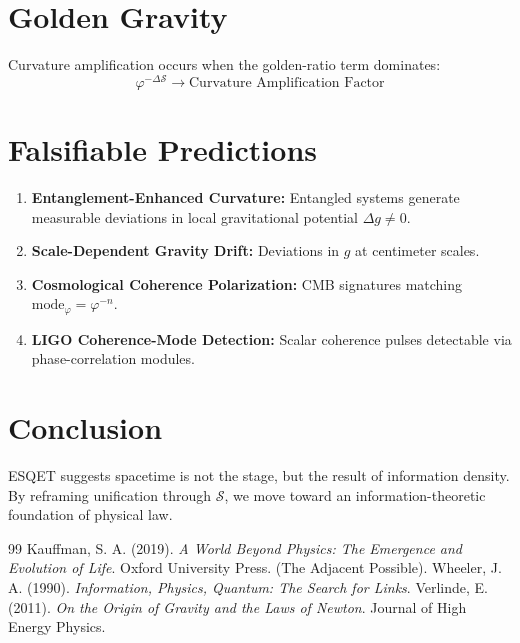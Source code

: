 \documentclass[11pt,a4paper]{article}
\begin{document}
\section{Golden Gravity}
Curvature amplification occurs when the golden-ratio term dominates:
\[ \varphi^{-\Delta\mathcal{S}} \rightarrow \text{Curvature Amplification Factor} \]

\section{Falsifiable Predictions}
\begin{enumerate}
    \item \textbf{Entanglement-Enhanced Curvature:} Entangled systems generate measurable deviations in local gravitational potential $\Delta g \neq 0$.
    \item \textbf{Scale-Dependent Gravity Drift:} Deviations in $g$ at centimeter scales.
    \item \textbf{Cosmological Coherence Polarization:} CMB signatures matching $\text{mode}_\varphi = \varphi^{-n}$.
    \item \textbf{LIGO Coherence-Mode Detection:} Scalar coherence pulses detectable via phase-correlation modules.
\end{enumerate}

\section{Conclusion}
ESQET suggests spacetime is not the stage, but the result of information density. By reframing unification through $\mathcal{S}$, we move toward an information-theoretic foundation of physical law.

\begin{thebibliography}{99}
 Kauffman, S. A. (2019). \textit{A World Beyond Physics: The Emergence and Evolution of Life}. Oxford University Press. (The Adjacent Possible).
 Wheeler, J. A. (1990). \textit{Information, Physics, Quantum: The Search for Links}.
 Verlinde, E. (2011). \textit{On the Origin of Gravity and the Laws of Newton}. Journal of High Energy Physics.
\end{thebibliography}
\end{document}
